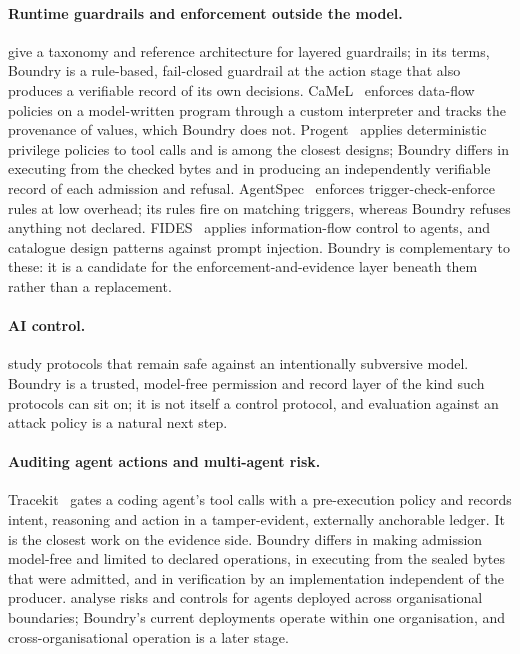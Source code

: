 \documentclass[11pt,a4paper]{article}
\begin{document}
\paragraph{Runtime guardrails and enforcement outside the model.} \citet{shamsujjoha2025swiss} give a taxonomy and reference architecture for layered guardrails; in its terms, Boundry is a rule-based, fail-closed guardrail at the action stage that also produces a verifiable record of its own decisions. CaMeL~\citep{debenedetti2025camel} enforces data-flow policies on a model-written program through a custom interpreter and tracks the provenance of values, which Boundry does not. Progent~\citep{shi2025progent} applies deterministic privilege policies to tool calls and is among the closest designs; Boundry differs in executing from the checked bytes and in producing an independently verifiable record of each admission and refusal. AgentSpec~\citep{wang2026agentspec} enforces trigger-check-enforce rules at low overhead; its rules fire on matching triggers, whereas Boundry refuses anything not declared. FIDES~\citep{costa2025fides} applies information-flow control to agents, and \citet{beurerkellner2025patterns} catalogue design patterns against prompt injection. Boundry is complementary to these: it is a candidate for the enforcement-and-evidence layer beneath them rather than a replacement.

\paragraph{AI control.} \citet{greenblatt2024control} study protocols that remain safe against an intentionally subversive model. Boundry is a trusted, model-free permission and record layer of the kind such protocols can sit on; it is not itself a control protocol, and evaluation against an attack policy is a natural next step.

\paragraph{Auditing agent actions and multi-agent risk.} Tracekit~\citep{ghosh2026tracekit} gates a coding agent's tool calls with a pre-execution policy and records intent, reasoning and action in a tamper-evident, externally anchorable ledger. It is the closest work on the evidence side. Boundry differs in making admission model-free and limited to declared operations, in executing from the sealed bytes that were admitted, and in verification by an implementation independent of the producer. \citet{reid2026multiagent} analyse risks and controls for agents deployed across organisational boundaries; Boundry's current deployments operate within one organisation, and cross-organisational operation is a later stage.
\end{document}
